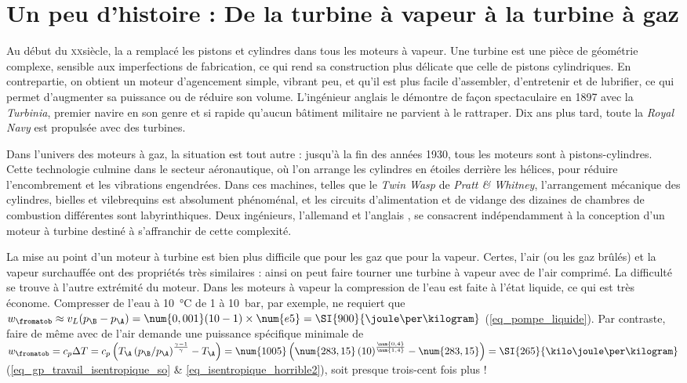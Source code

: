 \atstartofhistorysection
\section[Un peu d’histoire : de la turbine à vapeur à la turbine à gaz]{Un peu d’histoire :\onlyamphibook{\\} De la turbine à vapeur\onlyamphibook{\\} à la turbine à gaz}
\label{ch_histoire_turbine}


Au début du \textsc{xx}\ieme siècle, la  a remplacé les pistons et cylindres dans tous les moteurs à vapeur. 
Une turbine est une pièce de géométrie complexe, sensible aux imperfections de fabrication, ce qui rend sa construction plus délicate que celle de pistons cylindriques. En contrepartie, on obtient un moteur d’agencement simple, vibrant peu, et qu’il est plus facile d’assembler, d’entretenir et de lubrifier, ce qui permet d’augmenter sa puissance ou de réduire son volume. L’ingénieur anglais  le démontre de façon spectaculaire en 1897 avec la \textit{Turbinia}, premier navire en son genre et si rapide qu’aucun bâtiment militaire ne parvient à le rattraper. Dix ans plus tard, toute la \textit{Royal Navy} est propulsée avec des turbines.

Dans l’univers des moteurs à gaz, la situation est tout autre : jusqu’à la fin des années 1930, tous les moteurs sont à pistons-cylindres. Cette technologie culmine dans le secteur aéronautique, où l’on arrange les cylindres en étoiles derrière les hélices, pour réduire l’encombrement et les vibrations engendrées. Dans ces machines, telles que le \textit{Twin Wasp} de \textit{Pratt \& Whitney}, l’arrangement mécanique des cylindres, bielles et vilebrequins est absolument phénoménal, et les circuits d’alimentation et de vidange des dizaines de chambres de combustion différentes sont labyrinthiques. Deux ingénieurs, l’allemand  et l’anglais , se consacrent indépendamment à la conception d’un moteur à turbine destiné à s’affranchir de cette complexité.

La mise au point d’un moteur à turbine est bien plus difficile que pour les gaz que pour la vapeur. Certes, l’air (ou les gaz brûlés) et la vapeur surchauffée ont des propriétés très similaires : ainsi on peut faire tourner une turbine à vapeur avec de l’air comprimé. La difficulté se trouve à l’autre extrémité du moteur. Dans les moteurs à vapeur la compression de l’eau est faite à l’état liquide, ce qui est très économe. Compresser de l’eau à \SI{10}{\degreeCelsius} de \num{1} à \SI{10}{\bar}, par exemple, ne requiert que $w_\fromatob \approx v_L (p_\B - p_\A ) = \num{0,001} (10 - 1) \times \num{e5} = \SI{900}{\joule\per\kilogram}$ (\ref{eq_pompe_liquide}). Par contraste, faire de même avec de l’air demande une puissance spécifique minimale de $w_\fromatob = c_p \Delta T = c_p \left( T_\A \left(p_\B/p_\A\right)^\frac{\gamma - 1}{\gamma} - T_\A \right) = \num{1005} \left(\num{283,15} \left(10\right)^\frac{\num{0,4}}{\num{1,4}} - \num{283,15} \right) = \SI{265}{\kilo\joule\per\kilogram}$ (\ref{eq_gp_travail_isentropique_so} \& \ref{eq_isentropique_horrible2}), soit presque trois-cent fois plus !

